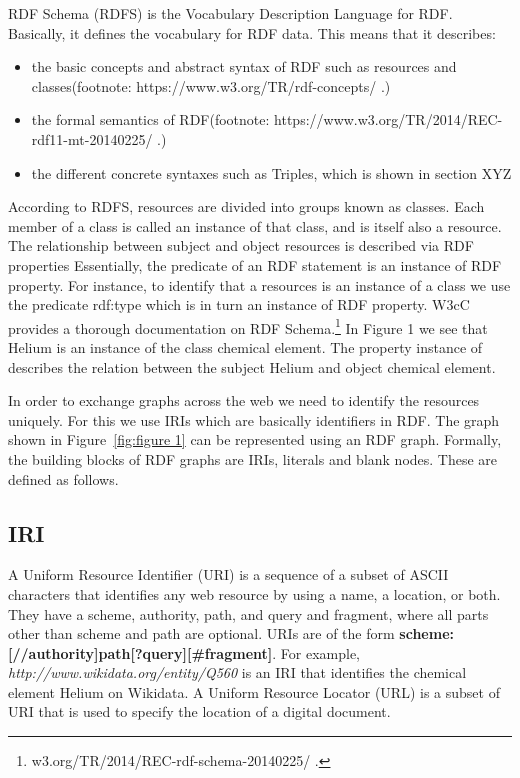 RDF Schema (RDFS) is the Vocabulary Description Language for RDF. Basically, it defines the vocabulary for RDF data. This means that it describes:

\begin{itemize}
	\item the basic concepts and abstract syntax of RDF such as resources and classes(footnote: https://www.w3.org/TR/rdf-concepts/ .)
	\item the formal semantics of RDF(footnote: https://www.w3.org/TR/2014/REC-rdf11-mt-20140225/ .)
	\item the different concrete syntaxes such as Triples, which is shown in section XYZ
\end{itemize}

According to RDFS, resources are divided into groups known as classes. Each member of a class is called an instance of that class, and is itself also a resource. The relationship between subject and object resources is described via RDF properties Essentially, the predicate of an RDF statement is an instance of RDF property. For instance, to identify that a resources is an instance of a class we use the predicate rdf:type which is in turn an instance of RDF property. W3cC provides a thorough documentation on RDF Schema.\footnote{w3.org/TR/2014/REC-rdf-schema-20140225/ .} In Figure 1 we see that Helium is an instance of the class chemical element. The property instance of describes the relation between the subject Helium and object chemical element.

In order to exchange graphs across the web we need to identify the resources uniquely. For this we use IRIs which are basically identifiers in RDF. The graph shown in Figure~\ref{fig:figure 1} can be represented using an RDF graph. Formally, the building blocks of RDF graphs are IRIs, literals and blank nodes. These are defined as follows.

\subsection*{IRI}
A Uniform Resource Identifier (\acrshort{URI}) is a sequence of a subset of ASCII characters that identifies any web resource by using a name, a location, or both. They have a scheme, authority, path, and query and fragment, where all parts other than scheme and path are optional. URIs are of the form \textbf{scheme:[//authority]path[?query][\#fragment]}. For example, \textit{http://www.wikidata.org/entity/Q560} is an IRI that identifies the chemical element Helium on Wikidata. A Uniform Resource Locator (\acrshort{URL}) is a subset of URI that is used to specify the location of a digital document.

